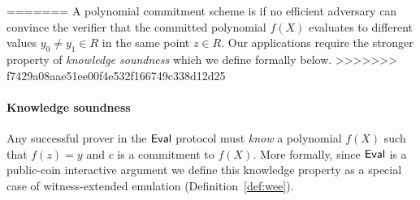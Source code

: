 \begin{definition}
=======
A polynomial commitment scheme is  if no efficient adversary can convince the verifier that the committed polynomial $f(X)$ evaluates to different values $y_0 \neq y_1 \in R$ in the same point $z \in R$. Our applications require the stronger property of \emph{knowledge soundness} which we define formally below.
>>>>>>> f7429a08aae51ee00f4e532f166749c338d12d25
\begin{comment}
	Let $b \gets \pro{Eval}_{\langle \adv_1, \verifier\rangle}(c, z, y, d, \st)$ denote the verifier's output in an execution of this protocol with adversarial prover $\adv_1$ on public inputs $c, z, y, d$ and private adversary state $\st$. %
Evaluation binding requires that for all probabilistic polynomial-time adversaries $\adv = (\adv_0, \adv_1)$,
\begin{small}
\[
    \Pr\left[
         b_0 = b_1 \neq 0 \, \wedge \, y_0 \neq y_1 \ 
         : \
       \begin{array}{l}
            \params \gets \pro{Setup}(1^\lambda) \\
            (c, z, y_0, y_1, d_0, d_1, \st_0, \st_1) \gets \adv_0(\params) \\
            b_0 \gets \pro{Eval}_{\langle \adv_1, \verifier} \rangle(\params, c, z, y_0, d_0; \st_0) \\
            b_1 \gets \pro{Eval}_{\langle \adv_1, \verifier} \rangle(\params, c, z, y_1, d_1; \st_1) \\
        \end{array}
    \right] \leq \negl \enspace .
\]
\end{small}

The syntax generalizes naturally to multivariate polynomial commitment schemes. Specifically, one obtains the syntax for an $\mu$-variate polynomial commitment scheme by replacing all occurrences of $X$ and $z$ by their $\mu$-dimensional vector counterparts, $\mathbf{X}$ and $\mathbf{z}$.
\end{comment}
\end{definition}

\paragraph{Knowledge soundness} %
Any successful prover in the $\textsf{{Eval}}$ protocol must \emph{know} a polynomial $f(X)$ such that $f(z) = y$ and $c$ is a commitment to $f(X)$. More formally, since $\textsf{{Eval}}$ is a public-coin interactive argument we define this knowledge property as a special case of witness-extended emulation (Definition~\ref{def:wee}). 

